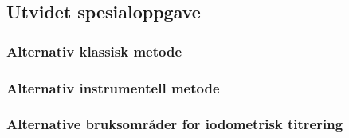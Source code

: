 

\subsection{Utvidet spesialoppgave}

\subsubsection{Alternativ klassisk metode}


\subsubsection{Alternativ instrumentell metode}


\subsubsection{Alternative bruksområder for iodometrisk titrering}
